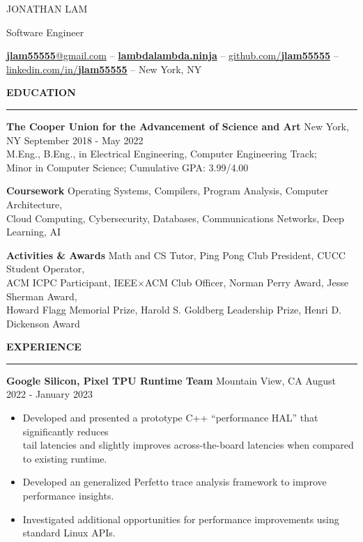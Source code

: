 \documentclass[]{article}
\newcommand{\br}{\vspace{10pt}}
\newcommand{\brs}{\vspace{3pt}}
\newcommand{\hr}{\vspace{4pt}\hrule\vspace{4pt}}
\begin{document}
\thispagestyle{empty}

{\LARGE JONATHAN LAM}

Software Engineer

\href{mailto:jlam55555@gmail.com}{\textbf{jlam55555}@gmail.com} --
\href{https://lambdalambda.ninja}{\textbf{lambdalambda.ninja}} --
\href{https://github.com/jlam55555}{github.com/\textbf{jlam55555}} --
\href{https://linkedin.com/in/jonlamdev}{linkedin.com/in/\textbf{jlam55555}} --
New York, NY

\br
\textbf{EDUCATION}
\hr
\textbf{The Cooper Union for the Advancement of Science and Art}
New York, NY
\hfill
September 2018 - May 2022\\
M.Eng., B.Eng., in Electrical Engineering, Computer Engineering Track;\\
Minor in Computer Science; Cumulative GPA: 3.99/4.00

\brs

\textbf{Coursework} Operating Systems, Compilers, Program Analysis, Computer
Architecture,\\
Cloud Computing, Cybersecurity, Databases, Communications Networks, Deep Learning, AI

\brs

\textbf{Activities \& Awards} Math and CS Tutor, Ping Pong Club President, CUCC
Student Operator, \\ ACM ICPC Participant, IEEE$\times$ACM Club Officer, Norman
Perry Award, Jesse Sherman Award, \\ Howard Flagg Memorial Prize, Harold S. Goldberg
Leadership Prize, Henri D. Dickenson Award

\br

\textbf{EXPERIENCE}
\hr

\textbf{Google Silicon, Pixel TPU Runtime Team}
Mountain View, CA
\hfill
August 2022 - January 2023
\begin{itemize}
\item Developed and presented a prototype C++ ``performance HAL'' that significantly reduces \\
  tail latencies and slightly improves across-the-board latencies when compared to existing runtime.
\item Developed an generalized Perfetto trace analysis framework to improve performance insights.
\item Investigated additional opportunities for performance improvements using standard Linux APIs.
\end{itemize}
\end{document}
